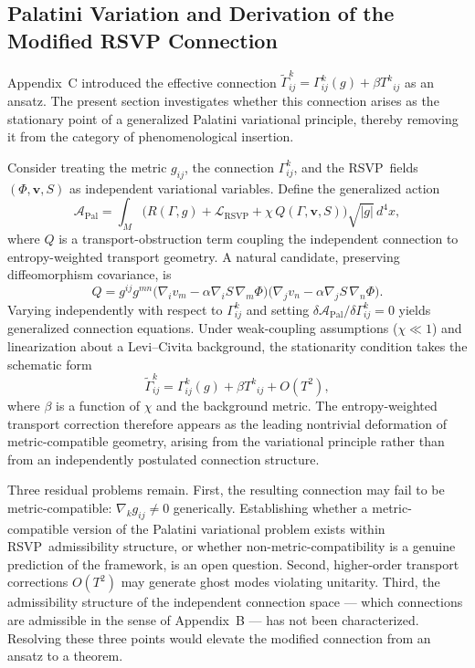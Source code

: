 \documentclass[12pt,a4paper]{article}
\newcommand{\RSVP}{\textrm{RSVP}}
\begin{document}
\subsection{Palatini Variation and Derivation of the Modified RSVP Connection}

Appendix~C introduced the effective connection
$\widetilde{\Gamma}^k_{ij}=\Gamma^k_{ij}(g)+\beta T^k{}_{ij}$
as an ansatz. The present section investigates whether this connection arises
as the stationary point of a generalized Palatini variational principle,
thereby removing it from the category of phenomenological insertion.

Consider treating the metric $g_{ij}$, the connection $\Gamma^k_{ij}$, and the
\RSVP\ fields $(\Phi,\mathbf{v},S)$ as independent variational variables.
Define the generalized action
\[
\mathcal{A}_\mathrm{Pal}
= \int_M\!\bigl(R(\Gamma,g)
+ \mathcal{L}_\RSVP
+ \chi\,Q(\Gamma,\mathbf{v},S)\bigr)\sqrt{|g|}\,d^4x,
\]
where $Q$ is a transport-obstruction term coupling the independent connection
to entropy-weighted transport geometry. A natural candidate, preserving
diffeomorphism covariance, is
\[
Q = g^{ij}g^{mn}
\bigl(\nabla_i v_m - \alpha\nabla_iS\,\nabla_m\Phi\bigr)
\bigl(\nabla_j v_n - \alpha\nabla_jS\,\nabla_n\Phi\bigr).
\]
Varying independently with respect to $\Gamma^k_{ij}$ and setting
$\delta\mathcal{A}_\mathrm{Pal}/\delta\Gamma^k_{ij}=0$ yields generalized
connection equations. Under weak-coupling assumptions ($\chi\ll 1$) and
linearization about a Levi--Civita background, the stationarity condition takes
the schematic form
\[
\widetilde{\Gamma}^k_{ij} = \Gamma^k_{ij}(g) + \beta T^k{}_{ij} + O(T^2),
\]
where $\beta$ is a function of $\chi$ and the background metric. The entropy-weighted
transport correction therefore appears as the leading nontrivial deformation of
metric-compatible geometry, arising from the variational principle rather than
from an independently postulated connection structure.

Three residual problems remain. First, the resulting connection may fail to be
metric-compatible: $\nabla_k g_{ij}\neq 0$ generically. Establishing whether
a metric-compatible version of the Palatini variational problem exists within
\RSVP\ admissibility structure, or whether non-metric-compatibility is a
genuine prediction of the framework, is an open question. Second, higher-order
transport corrections $O(T^2)$ may generate ghost modes violating unitarity.
Third, the admissibility structure of the independent connection space --- which
connections are admissible in the sense of Appendix~B --- has not been
characterized. Resolving these three points would elevate the modified
connection from an ansatz to a theorem.
\end{document}
